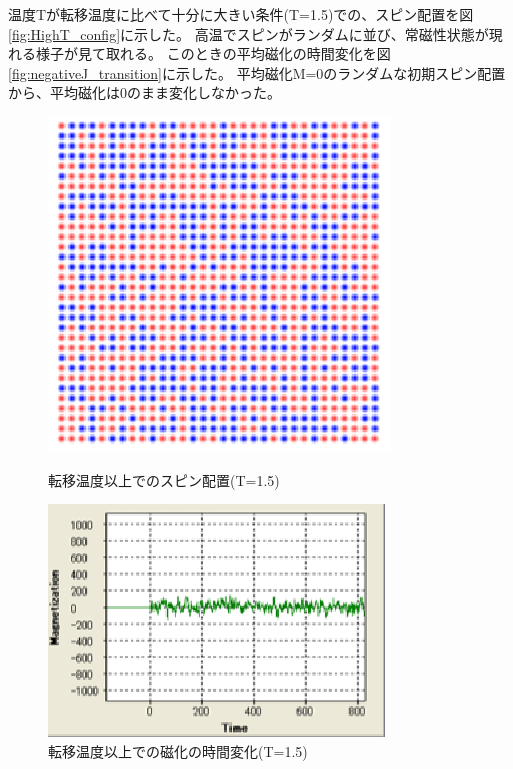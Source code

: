 \documentclass[11pt,a4]{jarticle}
\begin{document}
温度Tが転移温度に比べて十分に大きい条件(T=1.5)での、スピン配置を図\ref{fig:HighT_config}に示した。
高温でスピンがランダムに並び、常磁性状態が現れる様子が見て取れる。
このときの平均磁化の時間変化を図\ref{fig:negativeJ_transition}に示した。
平均磁化M=0のランダムな初期スピン配置から、平均磁化は0のまま変化しなかった。
\begin{figure}[htbp]
 \begin{minipage}{0.45\hsize}
  \begin{center}
   \includegraphics[width=0.9\hsize]{HighT_config.eps}
  \end{center}
  \caption{転移温度以上でのスピン配置(T=1.5)}
  \label{fig:HighT_config}
 \end{minipage}
 \begin{minipage}{0.55\hsize}
  \begin{center}
   \includegraphics[width=0.9\hsize]{HighT_transition.eps}
  \end{center}
  \caption{転移温度以上での磁化の時間変化(T=1.5)}
  \label{fig:HighT_transition}
 \end{minipage}
\end{figure}
\end{document}
